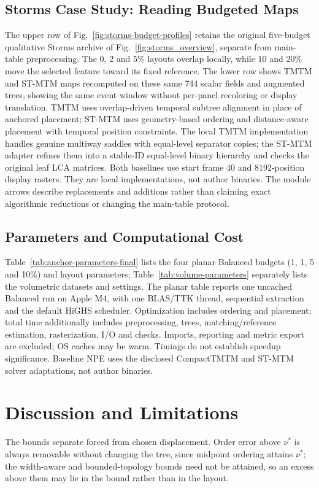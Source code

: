 \documentclass[review]{vgtc}
\begin{document}
\subsection{Storms Case Study: Reading Budgeted Maps}

The upper row of Fig.~\ref{fig:storms-budget-profiles} retains the original five-budget qualitative Storms archive of Fig.~\ref{fig:storms_overview}, separate from main-table preprocessing. The 0, 2 and 5\% layouts overlap locally, while 10 and 20\% move the selected feature toward its fixed reference. The lower row shows TMTM and ST-MTM maps recomputed on these same 744 scalar fields and augmented trees, showing the same event window without per-panel recoloring or display translation. TMTM uses overlap-driven temporal subtree alignment in place of anchored placement; ST-MTM uses geometry-based ordering and distance-aware placement with temporal position constraints. The local TMTM implementation handles genuine multiway saddles with equal-level separator copies; the ST-MTM adapter refines them into a stable-ID equal-level binary hierarchy and checks the original leaf LCA matrices. Both baselines use start frame 40 and 8192-position display rasters. They are local implementations, not author binaries. The module arrows describe replacements and additions rather than claiming exact algorithmic reductions or changing the main-table protocol.

\subsection{Parameters and Computational Cost}
Table~\ref{tab:anchor-parameters-final} lists the four planar Balanced budgets (1, 1, 5 and 10\%) and layout parameters; Table~\ref{tab:volume-parameters} separately lists the volumetric datasets and settings. The planar table reports one uncached Balanced run on Apple M4, with one BLAS/TTK thread, sequential extraction and the default HiGHS scheduler. Optimization includes ordering and placement; total time additionally includes preprocessing, trees, matching/reference estimation, rasterization, I/O and checks. Imports, reporting and metric export are excluded; OS caches may be warm. Timings do not establish speedup significance. Baseline NPE uses the disclosed CompactTMTM and ST-MTM solver adaptations, not author binaries.

\section{Discussion and Limitations}
The bounds separate forced from chosen displacement. Order error above $\nu^*$ is always removable without changing the tree, since midpoint ordering attains $\nu^*$; the width-aware and bounded-topology bounds need not be attained, so an excess above them may lie in the bound rather than in the layout.
\end{document}
